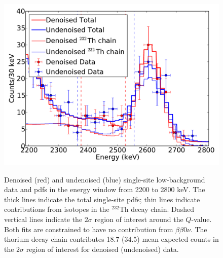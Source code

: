 \begin{figure}
\begin{center}
\includegraphics[keepaspectratio=true,width=\textwidth]{DenoisedVsUndenoised_TotalPdfsWithData_thrange_withlines2.pdf}
\end{center}
\renewcommand{\baselinestretch}{1}
\small\normalsize
\begin{quote}
\caption{Denoised (red) and undenoised (blue) single-site low-background data and pdfs in the energy window from 2200 to 2800 keV.  The thick lines indicate the total single-site pdfs; thin lines indicate contributions from isotopes in the $^{232}$Th decay chain.  Dashed vertical lines indicate the $2\sigma$ region of interest around the $Q$-value.  Both fits are constrained to have no contribution from $\beta\beta 0\nu$.  The thorium decay chain contributes 18.7 (34.5) mean expected counts in the $2\sigma$ region of interest for denoised (undenoised) data.}
\label{fig:DenoisedComparison_thSS}
\end{quote}
\end{figure}
\renewcommand{\baselinestretch}{2}
\small\normalsize

